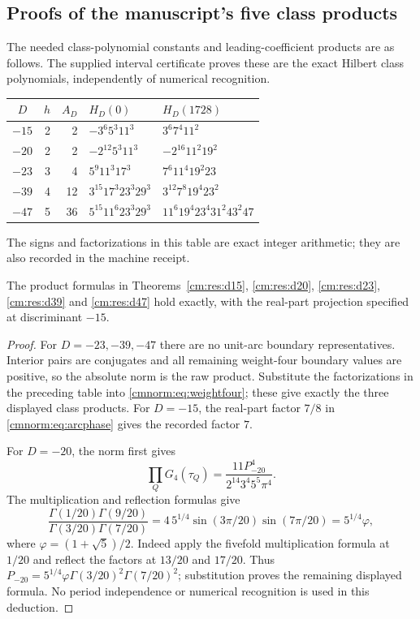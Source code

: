 \subsection{Proofs of the manuscript's five class products}

The needed class-polynomial constants and leading-coefficient products
are as follows. The supplied interval certificate proves these are the
exact Hilbert class polynomials, independently of numerical recognition.
\begin{center}
\begin{tabular}{c r r l l}
\toprule
$D$&$h$&$A_D$&$H_D(0)$&$H_D(1728)$\\
\midrule
$-15$&2&2&$-3^6 5^3 11^3$&$3^6 7^4 11^2$\\
$-20$&2&2&$-2^{12}5^3 11^3$&$-2^{16}11^2 19^2$\\
$-23$&3&4&$5^9 11^3 17^3$&$7^6 11^4 19^2 23$\\
$-39$&4&12&$3^{15}17^3 23^3 29^3$&$3^{12}7^8 19^4 23^2$\\
$-47$&5&36&$5^{15}11^6 23^3 29^3$&$11^6 19^4 23^4 31^2 43^2 47$\\
\bottomrule
\end{tabular}
\end{center}
The signs and factorizations in this table are exact integer arithmetic;
they are also recorded in the machine receipt.

\begin{corollary}
\label{cmnorm:cor:recorded}
The product formulas in Theorems~\ref{cm:res:d15}, \ref{cm:res:d20},
\ref{cm:res:d23}, \ref{cm:res:d39} and \ref{cm:res:d47} hold exactly,
with the real-part projection specified at discriminant $-15$.
\end{corollary}
\begin{proof}
For $D=-23,-39,-47$ there are no unit-arc boundary representatives.
Interior pairs are conjugates and all remaining weight-four boundary
values are positive, so the absolute norm is the raw product. Substitute
the factorizations in the preceding table into
\eqref{cmnorm:eq:weightfour}; these give exactly the three displayed
class products. For $D=-15$, the real-part factor $7/8$ in
\eqref{cmnorm:eq:arcphase} gives the recorded factor $7$.

For $D=-20$, the norm first gives
\[
 \prod_QG_4(\tau_Q)=\frac{11P_{-20}^4}{2^{14}3^4 5^5\pi^4}.
\]
The multiplication and reflection formulas give
\[
 \frac{\Gamma(1/20)\Gamma(9/20)}{\Gamma(3/20)\Gamma(7/20)}
 =4\,5^{1/4}\sin(3\pi/20)\sin(7\pi/20)=5^{1/4}\varphi,
\]
where $\varphi=(1+\sqrt5)/2$. Indeed apply the fivefold multiplication
formula at $1/20$ and reflect the factors at $13/20$ and $17/20$.
Thus $P_{-20}=5^{1/4}\varphi\Gamma(3/20)^2\Gamma(7/20)^2$;
substitution proves the remaining displayed formula. No period
independence or numerical recognition is used in this deduction.
\end{proof}

